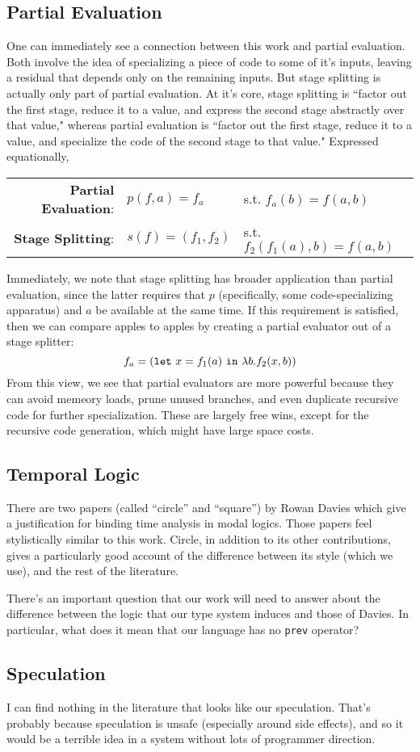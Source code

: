 \documentclass[11pt]{article}
\newcommand {\letin} [3] {{\tt let}~{#1} = {#2}~{\tt in}~{#3}}
\begin{document}
\subsection{Partial Evaluation}
One can immediately see a connection between this work and partial evaluation. Both involve the idea of specializing a piece of code to some of it's inputs, leaving a residual that depends only on the remaining inputs.  But stage splitting is actually only part of partial evaluation.  At it's core, stage splitting is ``factor out the first stage, reduce it to a value, and express the second stage abstractly over that value," whereas partial evaluation is ``factor out the first stage, reduce it to a value, and specialize the code of the second stage to that value."  Expressed equationally,
\begin{center}
\begin{tabular}{rll}
{\bf Partial Evaluation}:& $p(f,a)=f_a$ &s.t. $f_a(b) = f(a,b)$ \\
{\bf Stage Splitting}:& $s(f)=(f_1,f_2)$ &s.t. $f_2(f_1(a),b) = f(a,b)$
\end{tabular}
\end{center}
Immediately, we note that stage splitting has broader application than partial evaluation, since the latter requires that $p$ (specifically, some code-specializing apparatus) and $a$ be available at the same time.  If this requirement is satisfied, then we can compare apples to apples by creating a partial evaluator out of a stage splitter:
	\[f_a = (\letin {x}{f_1(a)}{\lambda b.f_2(x,b)})\]
From this view, we see that partial evaluators are more powerful because they can avoid memeory loads, prune unused branches, and even duplicate recursive code for further specialization.  These are largely free wins, except for the recursive code generation, which might have large space costs.

\subsection{Temporal Logic}

There are two papers (called ``circle'' and ``square'') by Rowan Davies which give a justification for binding time analysis in modal logics.  Those papers feel stylistically similar to this work.  Circle, in addition to its other contributions, gives a particularly good account of the difference between its style (which we use), and the rest of the literature. 

There's an important question that our work will need to answer about the difference between the logic that our type system induces and those of Davies.  In particular, what does it mean that our language has no {\tt prev} operator?

\subsection{Speculation}

I can find nothing in the literature that looks like our speculation.  That's probably because speculation is unsafe (especially around side effects), and so it would be a terrible idea in a system without lots of programmer direction.
\end{document}
